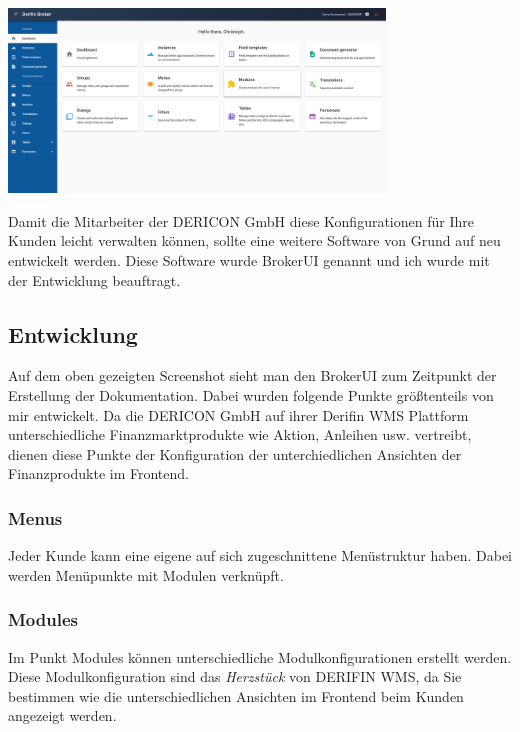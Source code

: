 \documentclass[chapterprefix=false, 12pt, a4paper, oneside, parskip=half, listof=totoc, bibliography=totoc, numbers=noendperiod]{scrbook}
\begin{document}
    \begin{center}
        \includegraphics[width=0.75\textwidth]{img/broker-ui-neu.png}
    \end{center}

    Damit die Mitarbeiter der DERICON GmbH diese Konfigurationen für Ihre Kunden leicht verwalten können, sollte eine
    weitere Software von Grund auf neu entwickelt werden. Diese Software wurde BrokerUI genannt und ich wurde mit der
    Entwicklung beauftragt.

    \subsection{Entwicklung}

    Auf dem oben gezeigten Screenshot sieht man den BrokerUI zum Zeitpunkt der Erstellung der Dokumentation. Dabei wurden folgende
    Punkte größtenteils von mir entwickelt. Da die DERICON GmbH auf ihrer Derifin WMS Plattform unterschiedliche Finanzmarktprodukte
    wie Aktion, Anleihen usw. vertreibt, dienen diese Punkte der Konfiguration der unterchiedlichen Ansichten der Finanzprodukte im
    Frontend.

    \subsubsection{Menus}

    Jeder Kunde kann eine eigene auf sich zugeschnittene Menüstruktur haben.
    Dabei werden Menüpunkte mit Modulen verknüpft.

    \subsubsection{Modules}

    Im Punkt Modules können unterschiedliche Modulkonfigurationen erstellt werden. Diese Modulkonfiguration sind das \textit{Herzstück}
    von DERIFIN WMS, da Sie bestimmen wie die unterschiedlichen Ansichten im Frontend beim Kunden angezeigt werden.
\end{document}

